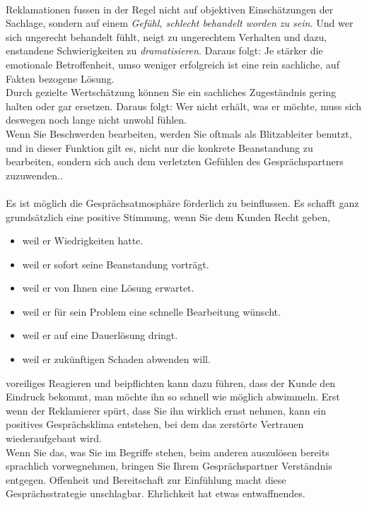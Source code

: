 \\
Reklamationen fussen in der Regel nicht auf objektiven Einschätzungen der Sachlage, sondern auf einem \emph{Gefühl, schlecht behandelt worden zu sein.} Und wer sich ungerecht behandelt fühlt, neigt zu ungerechtem Verhalten und dazu, enstandene Schwierigkeiten zu \emph{dramatisieren}. Daraus folgt: Je stärker die emotionale Betroffenheit, umso weniger erfolgreich ist eine rein sachliche, auf Fakten bezogene Lösung. \\
Durch gezielte Wertschätzung können Sie ein sachliches Zugeständnis gering halten oder gar ersetzen. Daraus folgt: Wer nicht erhält, was er möchte, muss sich deswegen noch lange nicht unwohl fühlen.\\
Wenn Sie Beschwerden bearbeiten, werden Sie oftmals als \glqq Blitzableiter \grqq benutzt, und in dieser Funktion gilt es, nicht nur die konkrete Beanstandung zu bearbeiten, sondern sich auch dem verletzten Gefühlen des Gesprächspartners zuzuwenden..\\
\\
Es ist möglich die Gesprächsatmosphäre förderlich zu beinflussen. Es schafft ganz grundsätzlich eine positive Stimmung, wenn Sie dem Kunden Recht geben, 
\begin{itemize}
\item weil er Wiedrigkeiten hatte.
\item weil er sofort seine Beanstandung vorträgt.
\item weil er von Ihnen eine Lösung erwartet.
\item weil er für sein Problem eine schnelle Bearbeitung wünscht. 
\item weil er auf eine Dauerlösung dringt.
\item weil er zukünftigen Schaden abwenden will.
\end{itemize}
voreiliges Reagieren und beipflichten kann dazu führen, dass der Kunde den Eindruck bekommt, man möchte ihn so schnell wie möglich abwimmeln. Erst wenn der Reklamierer spürt, dass Sie ihn wirklich ernst nehmen, kann ein positives Gesprächsklima entstehen, bei dem das zerstörte Vertrauen wiederaufgebaut wird.\\
Wenn Sie das, was Sie im Begriffe stehen, beim anderen auszulösen bereits sprachlich vorwegnehmen, bringen Sie Ihrem Gesprächspartner Verständnis entgegen.
Offenheit und Bereitschaft zur Einfühlung macht diese Gesprächsstrategie unschlagbar. Ehrlichkeit hat etwas entwaffnendes.\\
